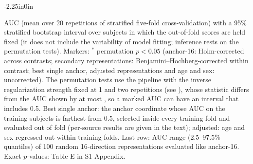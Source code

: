 \begin{table}[!ht]
\begin{adjustwidth}{-2.25in}{0in}
\begin{flushleft}\footnotesize AUC (mean over 20 repetitions of stratified five-fold cross-validation) with a 95\% stratified bootstrap interval over subjects in which the out-of-fold scores are held fixed (it does not include the variability of model fitting; inference rests on the permutation tests). Markers: $^{*}$ permutation $p<0.05$ (anchor-16: Holm-corrected across contrasts; secondary representations: Benjamini--Hochberg-corrected within contrast; best single anchor, adjusted representations and age and sex: uncorrected). The permutation tests use the pipeline with the inverse regularization strength fixed at 1 and two repetitions (see ), whose statistic differs from the AUC shown by at most \PermStatMaxDiff, so a marked AUC can have an interval that includes 0.5. Best single anchor: the anchor coordinate whose AUC on the training subjects is farthest from 0.5, selected inside every training fold and evaluated out of fold (per-source results are given in the text); adjusted: age and sex regressed out within training folds. Last row: AUC range (2.5--97.5\% quantiles) of 100 random 16-direction representations evaluated like anchor-16. Exact $p$-values: Table E in S1 Appendix.\end{flushleft}
\end{adjustwidth}
\end{table}
